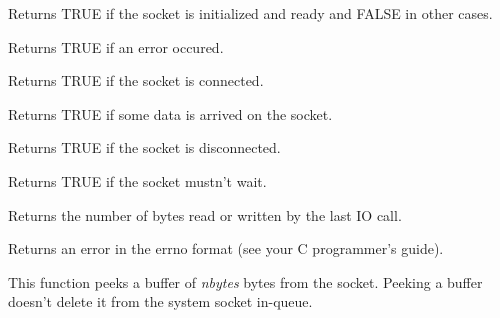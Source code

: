 
Returns TRUE if the socket is initialized and ready and FALSE in other
cases.

\label{wxsocketbaseerror}


Returns TRUE if an error occured.

\label{wxsocketbaseconnected}


Returns TRUE if the socket is connected.

\label{wxsocketbaseisdata}


Returns TRUE if some data is arrived on the socket. 

\label{wxsocketbasedisconnected}


Returns TRUE if the socket is disconnected.

\label{wxsocketbasenowait}


Returns TRUE if the socket mustn't wait.

\label{wxsocketbaselastcount}


Returns the number of bytes read or written by the last IO call.

\label{wxsocketbaselasterror}


Returns an error in the errno format (see your C programmer's guide).

%
%
\label{wxsocketbasepeek}


This function peeks a buffer of {\it nbytes} bytes from the socket. Peeking a buffer
doesn't delete it from the system socket in-queue.

